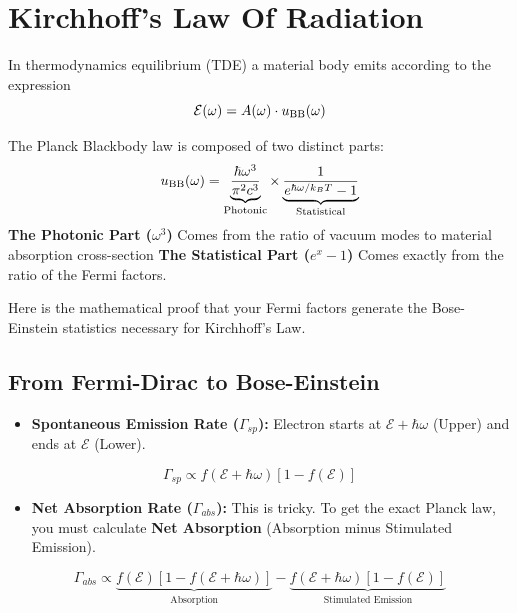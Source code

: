\newpage
\section{Kirchhoff's Law Of Radiation}
\label{app:kirchhoffs_law_of_radiation}

In thermodynamics equilibrium (TDE) a material body emits according to the expression
\begin{equation}
\mathcal{E}(\omega) = A(\omega)\cdot u_{\small\text{BB}}(\omega)
\label{eq:kirchhoff_emission}
\end{equation}

The Planck Blackbody law is composed of two distinct parts:
\begin{equation}
u_{\small \text{BB}}(\omega)= \underbrace{\frac{\hbar\omega^3}{\pi^2 c^3}}_{\text{Photonic}} \times \underbrace{\frac{1}{e^{\hbar\omega/k_B T} - 1}}_{\text{Statistical}}
\label{eq:kirchhoff_planck_parts}
\end{equation}
\textbf{The Photonic Part ($\omega^3$)} Comes from the ratio of vacuum modes to material absorption cross-section \textbf{The Statistical Part ($e^x - 1$)} Comes exactly from the ratio of the Fermi factors.

Here is the mathematical proof that your Fermi factors generate the Bose-Einstein statistics necessary for Kirchhoff's Law.

\subsection{From Fermi-Dirac to Bose-Einstein}

\begin{itemize}
  \item \textbf{Spontaneous Emission Rate ($\Gamma_{sp}$):} Electron starts at $\mathcal{E}+\hbar\omega$ (Upper) and ends at $\mathcal{E}$ (Lower).
\end{itemize}
\begin{equation}
\Gamma_{sp} \propto f(\mathcal{E}+\hbar\omega) [1 - f(\mathcal{E})]
\label{eq:kirchhoff_spontaneous}
\end{equation}

\begin{itemize}
  \item \textbf{Net Absorption Rate ($\Gamma_{abs}$):} This is tricky. To get the exact Planck law, you must calculate \textbf{Net Absorption} (Absorption minus Stimulated Emission).
\end{itemize}
\begin{equation}
\Gamma_{abs} \propto \underbrace{f(\mathcal{E}) [1 - f(\mathcal{E}+\hbar\omega)]}_{\text{Absorption}} - \underbrace{f(\mathcal{E}+\hbar\omega) [1 - f(\mathcal{E})]}_{\text{Stimulated Emission}}
\label{eq:kirchhoff_absorption}
\end{equation}

